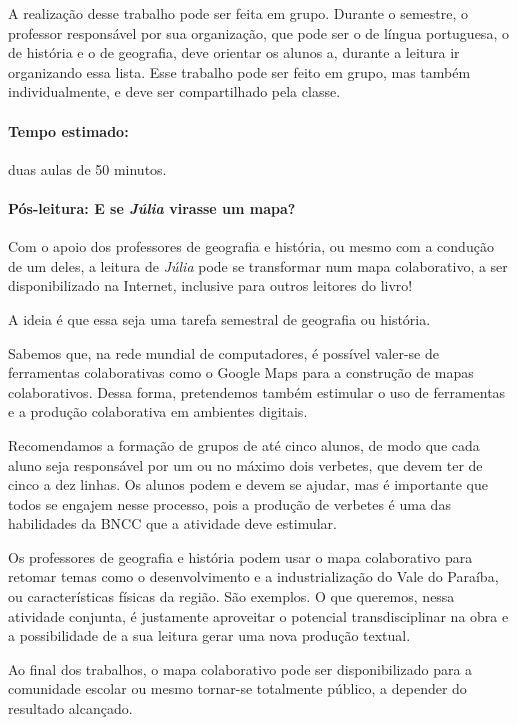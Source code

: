 \documentclass[12pt]{extarticle}
\begin{document}
A realização desse trabalho pode ser feita em grupo. Durante o semestre,
o professor responsável por sua organização, que pode ser o de língua
portuguesa, o de história e o de geografia, deve orientar os alunos a,
durante a leitura ir organizando essa lista. Esse trabalho pode ser
feito em grupo, mas também individualmente, e deve ser compartilhado
pela classe.

\paragraph{Tempo estimado:} duas aulas de 50 minutos.

\paragraph{Pós-leitura: E se \emph{Júlia} virasse um mapa?}

Com o apoio dos professores de geografia e história, ou mesmo com a
condução de um deles, a leitura de \emph{Júlia} pode se transformar num
mapa colaborativo, a ser disponibilizado na Internet, inclusive para
outros leitores do livro!

A ideia é que essa seja uma tarefa semestral de geografia ou história.

Sabemos que, na rede mundial de computadores, é possível valer-se de
ferramentas colaborativas como o Google Maps para a construção de mapas
colaborativos. Dessa forma, pretendemos também estimular o uso de ferramentas e a produção colaborativa em ambientes digitais.

Recomendamos a formação de grupos de até cinco alunos, de modo que cada
aluno seja responsável por um ou no máximo dois verbetes, que devem ter
de cinco a dez linhas. Os alunos podem e devem se ajudar, mas é
importante que todos se engajem nesse processo, pois a produção de verbetes é uma das habilidades da BNCC que a atividade deve estimular.


Os professores de geografia e história podem usar o mapa colaborativo
para retomar temas como o desenvolvimento e a industrialização do Vale
do Paraíba, ou características físicas da região. São exemplos. O que
queremos, nessa atividade conjunta, é justamente aproveitar o potencial
transdisciplinar na obra e a possibilidade de a sua leitura gerar uma
nova produção textual.

Ao final dos trabalhos, o mapa colaborativo pode ser disponibilizado
para a comunidade escolar ou mesmo tornar-se totalmente público, a
depender do resultado alcançado.
\end{document}
